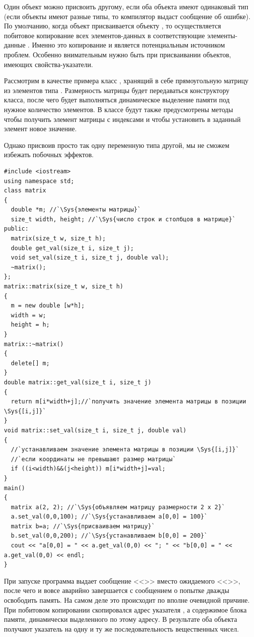 Один объект можно присвоить другому, если оба объекта имеют одинаковый тип (если объекты имеют разные типы, то
компилятор выдаст сообщение об ошибке). По умолчанию, когда объект  присваивается объекту
, то осуществляется побитовое копирование всех элементов-данных  в
соответствующие элементы-данные . Именно это копирование и является потенциальным источником
проблем. Особенно внимательным нужно быть при присваивании объектов, имеющих
свойства-указатели.

Рассмотрим в качестве примера класс , хранящий в
себе прямоугольную матрицу из элементов типа . Размерность матрицы
будет передаваться конструктору класса, после чего будет выполняться динамическое выделение памяти под нужное
количество элементов. В классе будут также предусмотрены методы 
чтобы получить элемент матрицы с индексами  и
 чтобы установить в заданный элемент новое значение. 

Однако присвоив просто так одну переменную типа 
другой, мы не сможем избежать побочных эффектов.
\begin{lstlisting}
#include <iostream>
using namespace std;
class matrix 
{
  double *m; //`\Sys{элементы матрицы}`
  size_t width, height; //`\Sys{число строк и столбцов в матрице}`
public:
  matrix(size_t w, size_t h);
  double get_val(size_t i, size_t j); 
  void set_val(size_t i, size_t j, double val);
  ~matrix();
};
matrix::matrix(size_t w, size_t h) 
{ 
  m = new double [w*h]; 
  width = w;
  height = h;
}
matrix::~matrix() 
{ 
  delete[] m; 
}
double matrix::get_val(size_t i, size_t j) 
{
  return m[i*width+j];//`получить значение элемента матрицы в позиции \Sys{[i,j]}`
}
void matrix::set_val(size_t i, size_t j, double val) 
{
  //`устанавливаем значение элемента матрицы в позиции \Sys{[i,j]}`
  //`если координаты не превышают размер матрицы`
  if ((i<width)&&(j<height)) m[i*width+j]=val;
}	
main() 
{
  matrix a(2, 2); //`\Sys{объявляем матрицу размерности 2 х 2}`
  a.set_val(0,0,100); //`\Sys{устанавливаем a[0,0] = 100}`
  matrix b=a; //`\Sys{присваиваем матрицу}`
  b.set_val(0,0,200); //`\Sys{устанавливаем b[0,0] = 200}`
  cout << "a[0,0] = " << a.get_val(0,0) << "; " << "b[0,0] = " << a.get_val(0,0) << endl;
}
\end{lstlisting}

При запуске программа выдает сообщение <<>>  вместо ожидаемого
<<>>, после чего и вовсе аварийно завершается с сообщением о попытке дважды освободить
память. На самом деле это происходит по вполне очевидной причине. При побитовом копировании скопировался адрес
указателя , а содержимое блока памяти, динамически выделенного по этому адресу. В результате оба
объекта получают указатель на одну и ту же последовательность вещественных чисел.

